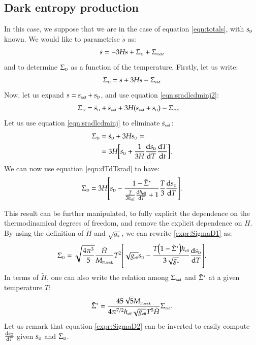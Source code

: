 \subsection{Dark entropy production}
In this case, we suppose that we are in the case of equation \eqref{eqn:totals},
with $\sD$ known. We would like to parametrise $\dot s$ as:
\begin{align}\label{eqn:dots_dark}
 \dot s = -3Hs + \SigmaD + \Sigmarad,
\end{align}
and to determine $\SigmaD$ as a function of the temperature. Firstly, let us
write:
\begin{align}
 \SigmaD= \dot s + 3Hs -\Sigmarad
\end{align}
Now, let us expand $s = \srad + \sD$, and use equation \eqref{eqn:sradlcdminj2}:
\begin{align}
 \SigmaD &= \dsD + \dsrad + 3H(\srad + \sD) -\Sigmarad
\end{align}
Let us use equation \eqref{eqn:sradlcdminj} to eliminate $\dsrad$:
\begin{align}
 \SigmaD &= \dsD + 3H\sD =\\
         &= 3H\qty[\sD  + \frac{1}{3H}\dv{\sD}{T}\dv{T}{t}].
\end{align}
We can now use equation \eqref{eqn:dTdTsrad} to have:
\begin{align}\label{expr:SigmaD1}
 \SigmaD = 3H\qty[\sD - \frac{1 - \Sigmatstar}{\frac{T}{3\heff}\dv{\heff}{T} +1}\frac{T}{3}\dv{\sD}{T}].
\end{align}

This result can be further manipulated, to fully explicit the dependence on the
thermodinamical degrees of freedom, and remove the explicit dependence on $H$.
By using the definition of $\tilde H$ and $\sqrt{g_\ast}$, we can rewrite
\eqref{expr:SigmaD1} as:
\begin{align}\label{expr:SigmaD2}
 \SigmaD = \sqrt{\frac{4\pi^3}{5}}\frac{\tilde H}{\Mpl} T^2 \qty[\sqrt{\geff}\sD - \frac{T\qty(1 - \Sigmatstar)\heff}{3\sqrt{g_\ast}}\dv{\sD}{T}].
\end{align}
In terms of $\tilde H$, one can also write the relation among $\Sigmarad$
and $\Sigmatstar$ at a given temperature $T$:
\begin{align}
 \Sigmatstar = \frac{45\sqrt{5}\Mpl}{4 \pi^{7/2}\heff \sqrt{\geff} T^5 \tilde H}\Sigmarad.
\end{align}
Let us remark that equation \eqref{expr:SigmaD2} can be inverted to easily compute
$\dv{\sD}{T}$ given $\sD$ and $\SigmaD$.


